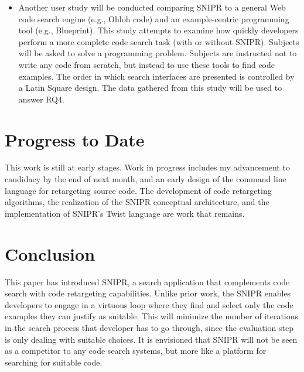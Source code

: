 \documentclass[conference]{IEEEtran}
\begin{document}
\begin{itemize}
\item Another user study will be conducted comparing \uppercase{SnipR} to a general Web code search engine (e.g., Ohloh code) and an example-centric programming tool (e.g., Blueprint). This study attempts to examine how quickly developers perform a more complete code search task (with or without \uppercase{SnipR}). Subjects will be asked to solve a programming problem. Subjects are instructed not to write any code from scratch, but instead to use these tools to find code examples. The order in which search interfaces are presented is controlled by a Latin Square design. The data gathered from this study will be used to answer RQ4.       
\end{itemize}

\section{Progress to Date}
\label{sec:progress}
This work is still at early stages. Work in progress includes my advancement to candidacy by the end of next month, and an early design of the command line language for retargeting source code. The development of code retargeting algorithms, the realization of the \uppercase{SnipR} conceptual architecture, and the implementation of SNIPR's Twist language are work that remains.

\section{Conclusion}
\label{sec:conclude}
This paper has introduced \uppercase{SnipR}, a search application that complements code search with code retargeting capabilities. Unlike prior work, the \uppercase{SnipR} enables developers to engage in a virtuous loop where they find and select only the code examples they can justify as suitable. This will minimize the number of iterations in the search process that developer has to go through, since the evaluation step is only dealing with suitable choices. It is envisioned that \uppercase{SnipR} will not be seen as a competitor to any code search systems, but more like a platform for searching for suitable code.





%
  
\end{document}
